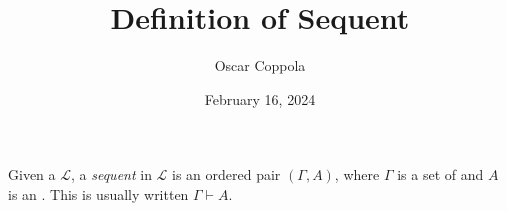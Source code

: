 \documentclass[a4paper]{article}
\title{Definition of Sequent}
\date{February 16, 2024}
\author{Oscar Coppola}
\begin{document}
\maketitle
\par{
    Given a  \(\mathcal {L}\), a \emph{sequent} in \(\mathcal {L}\) is an ordered pair \(( \Gamma , A)\),
    where \(\Gamma\) is a set of  and \(A\) is an .
    This is usually written \(\Gamma \vdash  A\).
}
\printbibliography
\end{document}

